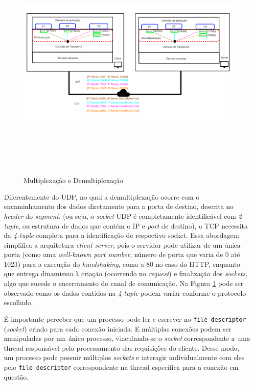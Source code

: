 \begin{figure}[h!]
\centering
\includegraphics[keepaspectratio, width=16cm, height=12cm]{imagens/11/11 - Multiplexacao e Demultiplexacao.png}
\caption{Multiplexação e Demultiplexação\\}
\label{Multiplexação e Demultiplexação}
\end{figure}



Diferentemente do UDP, no qual a demultiplexação ocorre com o
encaminhamento dos dados diretamente para a porta de destino, descrita
no \emph{header} do \emph{segment}, (ou seja, o \emph{socket} UDP é
completamente identificável com \emph{2-tuple}, ou estrutura de dados
que contém o IP e \emph{port} de destino), o TCP necessita da
\emph{4-tuple} completa para a identificação do respectivo socket. Essa
abordagem simplifica a arquitetura \emph{client-server}, pois o servidor
pode utilizar de um única porta (como uma \emph{well-known port number},
número de porta que varia de 0 até 1023) para a execução do
\emph{handshaking}, como a 80 no caso do HTTP, enquanto que entrega
dinamismo à criação (ocorrendo no \emph{request}) e finalização dos
\emph{sockets}, algo que sucede o encerramento do canal de comunicação.
Na Figura \ref{Multiplexação e Demultiplexação} pode ser observado como os dados contidos na \emph{4-tuple}
podem variar conforme o protocolo escolhido.

É importante perceber que um processo pode ler e escrever no
\texttt{file\ descriptor} (\emph{socket}) criado para cada conexão
iniciada. E múltiplas conexões podem ser manipuladas por um único
processo, vinculando-se o \emph{socket} correspondente a uma thread
responsável pelo processamento das requisições do cliente. Desse modo,
um processo pode possuir múltiplos \emph{sockets} e interagir
individualmente com eles pelo \texttt{file\ descriptor} correspondente
na thread específica para a conexão em questão.

